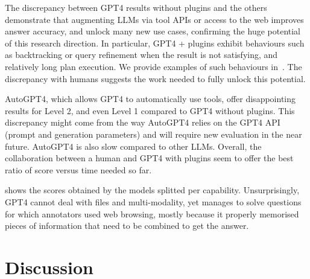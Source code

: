 \documentclass{fairmeta}
\begin{document}
The discrepancy between GPT4 results without plugins and the others demonstrate that augmenting LLMs via tool APIs or access to the web improves answer accuracy, and unlock many new use cases, confirming the huge potential of this research direction. In particular, GPT4 + plugins exhibit behaviours such as backtracking or query refinement when the result is not satisfying, and relatively long plan execution. We provide examples of such behaviours in~. The discrepancy with humans suggests the work needed to fully unlock this potential.

AutoGPT4, which allows GPT4 to automatically use tools, offer disappointing results for Level 2, and even Level 1 compared to GPT4 without plugins. This discrepancy might come from the way AutoGPT4 relies on the GPT4 API (prompt and generation parameters) and will require new evaluation in the near future. AutoGPT4 is also slow compared to other LLMs. Overall, the collaboration between a human and GPT4 with plugins seem to offer the best ratio of score versus time needed so far.

 shows the scores obtained by the models splitted per capability. Unsurprisingly, GPT4 cannot deal with files and multi-modality, yet manages to solve questions for which annotators used web browsing, mostly because it properly memorised pieces of information that need to be combined to get the answer.

\begin{comment}

\begin{table}[]
    \centering
    \begin{tabular}{lccc}
        \toprule
        Model &  Level 1 & Level 2 & Level 3 \\
        \midrule
        GPT4 + plugins & \\
        GPT4 &  \\
        Claude2 \\
        \bottomrule
    \end{tabular}
    \caption{We evaluated different assistants via their API or manually when no API was available.}
    \label{tab:evals}
\end{table}

\end{comment}
\vspace{-.3cm}

\section{Discussion}
\end{document}
